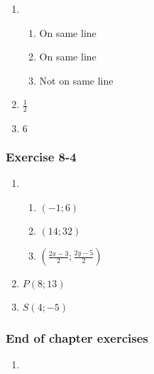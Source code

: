 {\begin{multicols}{3}
\begin{enumerate}[noitemsep, label=\textbf{\arabic*}. ]
\item %
\begin{enumerate}[noitemsep, label=\textbf{(\alph*)} ]
\item On same line%
\item On same line%
\item Not on same line %
\end{enumerate}
\item $\frac{1}{2}$%
\item $6$%
\end{enumerate}
\subsubsection*{Exercise 8-4} %
\begin{enumerate}[noitemsep, label=\textbf{\arabic*}. ]
\item %
  \begin{enumerate}[noitemsep, label=\textbf{(\alph*)} ]
\item $(-1 ; 6)$%
\item $(14 ; 32)$%
\item $(\frac{2x - 3}{2} ; \frac{2y - 5}{2})$%
\end{enumerate}

\item $P(8 ; 13)$%
\item $S(4 ; -5)$%

\end{enumerate}
\subsubsection*{End of chapter exercises} %

\begin{enumerate}[noitemsep, label=\textbf{\arabic*}. ] 
\item %


\end{enumerate}
\end{multicols}}
